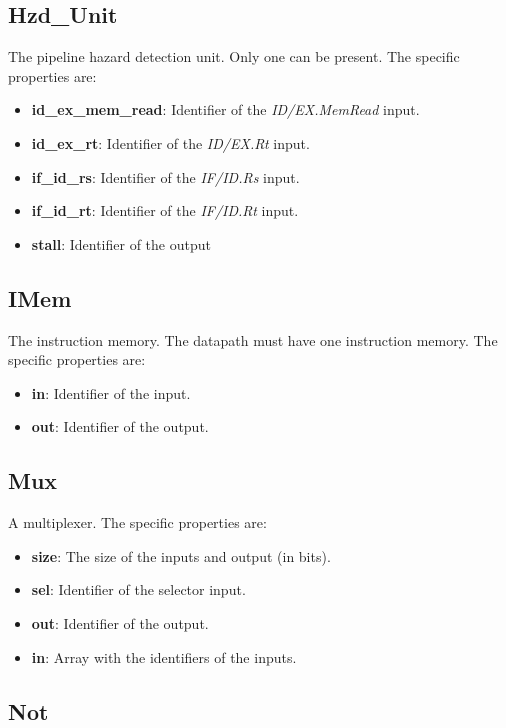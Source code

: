 \documentclass[11pt,a4paper,twoside,titlepage]{report}
\begin{document}
\subsection{Hzd\_Unit}

The pipeline hazard detection unit. Only one can be present.
The specific properties are:
\begin{itemize}
	\item \textbf{id\_ex\_mem\_read}: Identifier of the \textit{ID/EX.MemRead} input.
	\item \textbf{id\_ex\_rt}: Identifier of the \textit{ID/EX.Rt} input.
	\item \textbf{if\_id\_rs}: Identifier of the \textit{IF/ID.Rs} input.
	\item \textbf{if\_id\_rt}: Identifier of the \textit{IF/ID.Rt} input.
	\item \textbf{stall}: Identifier of the output
\end{itemize}

\subsection{IMem}

The instruction memory. The datapath must have one instruction memory.
The specific properties are:
\begin{itemize}
	\item \textbf{in}: Identifier of the input.
	\item \textbf{out}: Identifier of the output.
\end{itemize}

\subsection{Mux}

A multiplexer. The specific properties are:
\begin{itemize}
	\item \textbf{size}: The size of the inputs and output (in bits).
	\item \textbf{sel}: Identifier of the selector input.
	\item \textbf{out}: Identifier of the output.
	\item \textbf{in}: Array with the identifiers of the inputs.
\end{itemize}

\subsection{Not}
\end{document}
